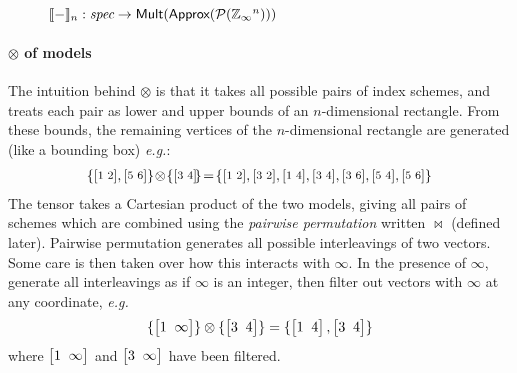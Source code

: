 \documentclass[10pt,preprint,numbers]{sigplanconf}
\theoremstyle{definition}
\newcommand{\eg}{\emph{e.g.}}
\newcommand{\interp}[1]{\llbracket{#1}\rrbracket}
\newcommand{\vtwohs}[2]{\setlength{\arraycolsep}{0em}
\left[\begin{array}{cc}#1 \, & \, #2\end{array}\right]\!}
\newcommand{\vtwoh}[2]{\setlength{\arraycolsep}{0em}
\left[\begin{array}{cc}#1 \; & \; #2\end{array}\right]}
\begin{document}


%


%

\begin{figure}
\vspace{-1em}

\caption{%
$\interp{-}_n : \textit{spec} \rightarrow \textsf{Mult}(\textsf{Approx}(\mathcal{P}(\domainVal{}^n)))$}
\label{fig:spatial-model}
\vspace{-0.75em}
\end{figure}

\paragraph{$\otimes$ of models}

The intuition behind $\otimes$ is that it takes all possible pairs of
index schemes, and treats each pair as lower and upper bounds of an
$n$-dimensional rectangle. From these bounds,
the remaining vertices of the $n$-dimensional rectangle are
generated (like a bounding box) \eg{}:
\begin{align*}
{\small{
\{\vtwohs{1}{2},\vtwohs{5}{6}\,\}\!\otimes\!\{\vtwohs{3}{4}\}\!=\!\{\vtwohs{1}{2},\vtwohs{3}{2},\vtwohs{1}{4},\vtwohs{3}{4},
   \vtwohs{3}{6},\vtwohs{5}{4},\vtwohs{5}{6}\,\}
}}
\end{align*}
The tensor takes a Cartesian product of the two models,
giving all pairs of schemes which are combined using the
\emph{pairwise permutation} written $\bowtie$ (defined later).
Pairwise permutation generates all possible interleavings of two
vectors. Some care is then taken over how this interacts with $\infty$.
In the presence of $\infty$, generate all interleavings as if $\infty$ is
an integer, then filter out vectors with $\infty$ at any coordinate, \eg{}
\begin{align*}
\{\vtwoh{1}{\infty}\} \otimes \{\vtwoh{3}{4}\} =
\{\vtwoh{1}{4}, \vtwoh{3}{4}\}
\end{align*}
%
where $\vtwoh{1}{\infty}$ and $\vtwoh{3}{\infty}$ have been filtered.
\end{document}
